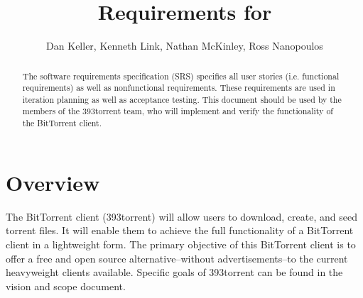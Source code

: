 \documentclass[letter]{scrartcl}
\newcommand{\app}{\sc{393torrent}}
\begin{document}
\title{Requirements for \app}
\subtitle{Dan Keller, Kenneth Link, Nathan McKinley, Ross Nanopoulos}
\date{} %

\maketitle

\begin{abstract}
The software requirements specification (SRS) specifies all user stories (i.e. functional requirements) as well as nonfunctional requirements. These requirements are used in iteration planning as well as acceptance testing.  This document should be used by the members of the 393torrent team, who will implement and verify the functionality of the BitTorrent client.
\end{abstract}

\tableofcontents
\pagebreak

\section{Overview}
The BitTorrent client (393torrent) will allow users to download, create, and seed torrent files.  It will enable them to achieve the full functionality of a BitTorrent client in a lightweight form.  The primary objective of this BitTorrent client is to offer a free and open source alternative--without advertisements--to the current heavyweight clients available.  Specific goals of 393torrent can be found in the vision and scope document.
\end{document}
